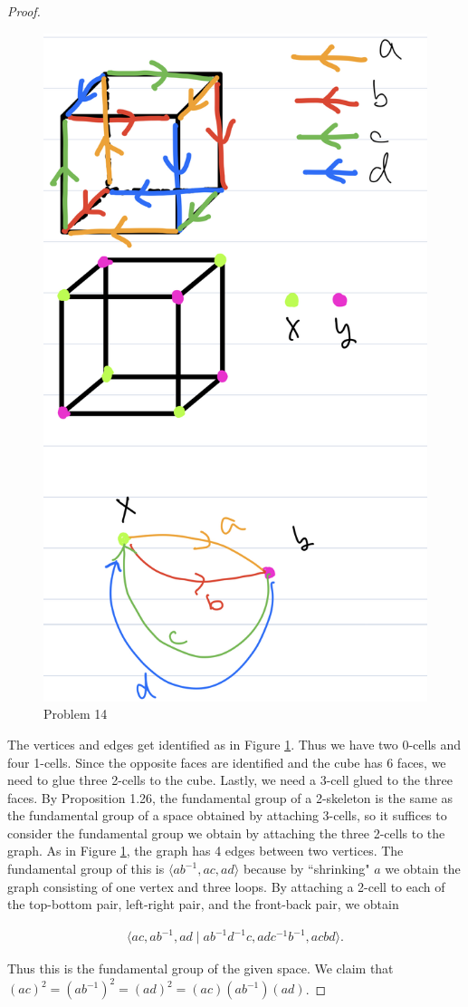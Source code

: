 \documentclass[12pt, psamsfonts]{amsart}
\theoremstyle{definition}
\theoremstyle{remark}
\numberwithin{equation}{section}
\begin{document}
\begin{proof}
  \begin{figure}
    \includegraphics[width=.5\linewidth]{cube.jpeg}
    \caption{Problem 14}
    \label{fig:cube}
  \end{figure}
  The vertices and edges get identified as in Figure \ref{fig:cube}.
  Thus we have two 0-cells and four 1-cells.
  Since the opposite faces are identified and the cube has 6 faces, we need to glue three 2-cells to the cube.
  Lastly, we need a 3-cell glued to the three faces.
  By Proposition 1.26, the fundamental group of a 2-skeleton is the same as the fundamental group of a space obtained by attaching 3-cells, so it suffices to consider the fundamental group we obtain by attaching the three 2-cells to the graph.
  As in Figure \ref{fig:cube}, the graph has 4 edges between two vertices.
  The fundamental group of this is $\langle ab^{-1}, ac, ad \rangle$ because by ``shrinking" $a$ we obtain the graph consisting of one vertex and three loops.
  By attaching a 2-cell to each of the top-bottom pair, left-right pair, and the front-back pair, we obtain

  \begin{align*}
    \langle ac, ab^{-1}, ad \mid ab^{-1}d^{-1}c, adc^{-1}b^{-1}, acbd \rangle.
  \end{align*}

  Thus this is the fundamental group of the given space.
  We claim that $(ac)^2 = (ab^{-1})^2 = (ad)^2 = (ac)(ab^{-1})(ad)$.


\end{proof}
\end{document}
